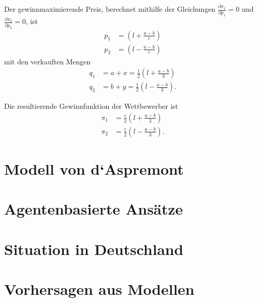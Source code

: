 Der gewinnmaximierende Preis, berechnet mithilfe der Gleichungen $\frac{\partial \pi_1}{\partial p_1}=0$ und $\frac{\partial \pi_2}{\partial p_2}=0$, ist
\begin{equation}
\begin{split}
p_1 &= \left(l+\frac{a-b}{c}\right) \\
p_2 &= \left(l-\frac{a-b}{c}\right)
\end{split}
\end{equation}
mit den verkauften Mengen
\begin{equation}
\begin{split}
q_1 &= a + x = \tfrac{1}{2} \left(l + \frac{a-b}{3}\right) \\
q_2 &= b + y = \tfrac{1}{2} \left(l - \frac{a-b}{3}\right)
.\end{split}
\end{equation}

Die resultierende Gewinnfunktion der Wettbewerber ist
\begin{equation}\label{eqn:Gewinnfunktion}
\begin{split}
\pi_1 &= \frac{c}{2} \left(l+\frac{a-b}{3}\right) \\
\pi_2 &= \frac{c}{2} \left(l-\frac{a-b}{3}\right)
.\end{split}
\end{equation}

\section{Modell von d‘Aspremont}\label{Sec-Aspremont}

\section{Agentenbasierte Ansätze}\label{Sec-ABM}

\section{Situation in Deutschland}\label{Sec-Deutschland}

\section{Vorhersagen aus Modellen}\label{Sec-Vorhersagen}
